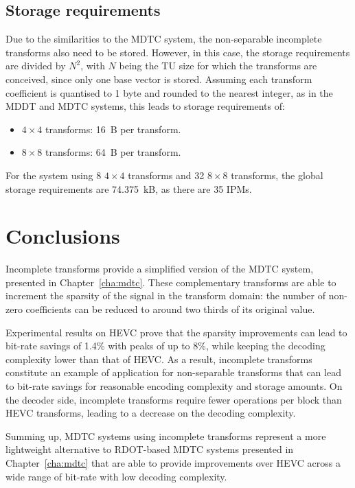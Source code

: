 \documentclass[11pt,a4paper,openright,twoside]{book}
\numberwithin{equation}{section} %
\numberwithin{figure}{section} %
\numberwithin{table}{section} %
\begin{document}
\subsection{Storage requirements}
\label{sub:it_storage_requirements}

Due to the similarities to the \ac{MDTC} system, the non-separable incomplete
transforms also need to be stored.
However, in this case, the storage requirements are divided by $N^2$, with $N$
being the \ac{TU} size for which the transforms are conceived, since only one
base vector is stored.
Assuming each transform coefficient is quantised to 1 byte and rounded to the
nearest integer, as in the \ac{MDDT} and \ac{MDTC} systems, this leads to
storage requirements of:
\begin{itemize}
	\item $4\times4$ transforms: \SI{16}{B} per transform.
	\item $8\times8$ transforms: \SI{64}{B} per transform.
\end{itemize}
For the system using 8 $4\times4$ transforms and 32 $8\times8$ transforms, the
global storage requirements are \SI{74.375}{\kilo B}, as there are 35
\acp{IPM}.

\section{Conclusions}
\label{sec:it_conclusions}

Incomplete transforms provide a simplified version of the \ac{MDTC} system,
presented in Chapter~\ref{cha:mdtc}.
These complementary transforms are able to increment the sparsity of the
signal in the transform domain:
the number of non-zero coefficients can be reduced to around two thirds of
its original value.

Experimental results on \ac{HEVC} prove that the sparsity improvements can
lead to bit-rate savings of 1.4\% with peaks of up to 8\%, while keeping
the decoding complexity lower than that of \ac{HEVC}.
As a result, incomplete transforms constitute an example of application for
non-separable transforms that can lead to bit-rate savings for reasonable
encoding complexity and storage amounts.
On the decoder side, incomplete transforms require fewer operations per block
than \ac{HEVC} transforms, leading to a decrease on the decoding complexity.

Summing up, \ac{MDTC} systems using incomplete transforms represent a more
lightweight alternative to \ac{RDOT}-based \ac{MDTC} systems presented in
Chapter~\ref{cha:mdtc} that are able to provide improvements over \ac{HEVC}
across a wide range of bit-rate with low decoding complexity.
\end{document}
